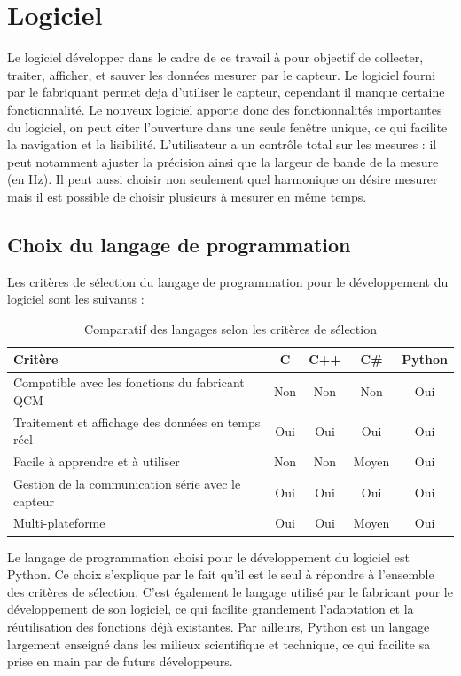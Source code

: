 \chapter{Logiciel}
Le logiciel développer dans le cadre de ce travail à pour objectif de collecter, traiter, afficher, et sauver les données mesurer par le capteur.
Le logiciel fourni par le fabriquant permet deja d'utiliser le capteur, cependant il manque certaine fonctionnalité. Le nouveux logiciel apporte donc des fonctionnalités  importantes du logiciel, on peut citer l’ouverture dans une seule fenêtre unique, ce qui facilite la navigation et la lisibilité.
L'utilisateur a un contrôle total sur les mesures : il peut notamment ajuster la précision ainsi que la largeur de bande de la mesure (en Hz).
Il peut aussi choisir non seulement quel harmonique on désire mesurer mais il est possible de choisir plusieurs à mesurer en même temps.

\section{Choix du langage de programmation}

Les critères de sélection du langage de programmation pour le développement du logiciel sont les suivants :

\begin{table}[H]
    \centering
    \begin{tabular}{|p{6cm}|c|c|c|c|}
        \hline
        \textbf{Critère} & \textbf{C} & \textbf{C++} & \textbf{C\#} & \textbf{Python} \\
        \hline
        Compatible avec les fonctions du fabricant QCM & Non & Non & Non & Oui \\
        \hline
        Traitement et affichage des données en temps réel & Oui & Oui & Oui & Oui \\
        \hline
        Facile à apprendre et à utiliser & Non & Non & Moyen & Oui \\
        \hline
        Gestion de la communication série avec le capteur & Oui & Oui & Oui & Oui \\
        \hline
        Multi-plateforme & Oui & Oui & Moyen & Oui \\
        \hline
    \end{tabular}
    \caption{Comparatif des langages selon les critères de sélection}
    \label{tab:comparatif_langages}
\end{table}

Le langage de programmation choisi pour le développement du logiciel est Python.  
Ce choix s’explique par le fait qu’il est le seul à répondre à l’ensemble des critères de sélection. C’est également le langage utilisé par le fabricant pour le développement de son logiciel, ce qui facilite grandement l’adaptation et la réutilisation des fonctions déjà existantes.  
Par ailleurs, Python est un langage largement enseigné dans les milieux scientifique et technique, ce qui facilite sa prise en main par de futurs développeurs.



